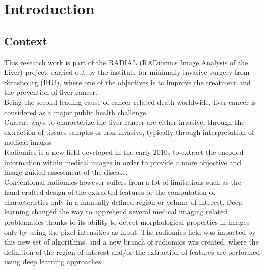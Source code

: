 \chapter{Introduction}

\section{Context}
This research work is part of the RADIAL (RADiomics Image Analysis of the Liver) project, carried out by the
institute for minimally invasive surgery from Strasbourg (IHU), where
one of the objectives is to improve the treatment and the prevention of
liver cancer.\\
Being the second leading cause of cancer-related death worldwide, liver
cancer is considered as a major public health challenge.\\
Current ways to characterize the liver cancer are either invasive, 
through the extraction of tissues samples or non-invasive, typically 
through interpretation of medical images.\\
Radiomics is a new field developed in the early 2010s to extract the encoded information within medical images in order to provide a more objective and image-guided assessment of the disease.\\
Conventional radiomics however suffers from a lot of limitations such as the hand-crafted design of the extracted features or the computation of characteristics only in a manually defined region or volume of interest. Deep learning changed the way to apprehend several medical imaging related problematics thanks to its ability to detect
morphological properties in images only by using the pixel intensities
as input. The radiomics field was impacted by this new set of algorithms, and a new branch of radiomics was created, where the definition of the region of interest and/or the extraction of features are performed using deep learning approaches.

